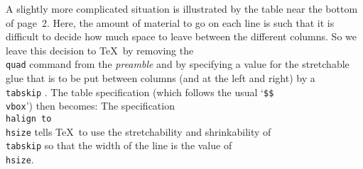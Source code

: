 A slightly more complicated situation is illustrated by the table near the
bottom of page~2. Here, the amount of material to go on each line is such
that it is difficult to decide how much space to leave between the
different columns.  So we leave this decision to \TeX\ by removing the
{\tt \\quad} command from the {\sl preamble} and by specifying a value for the
stretchable glue that is to be put between columns (and at the left and
right) by a {\tt \\tabskip} \cs.  The table
specification (which follows the usual `{\tt \$\$\\vbox\lbr}') then becomes:
\smallskip
The specification {\tt \\halign to \\hsize} tells \TeX\ to use the 
stretchability and shrinkability of {\tt \\tabskip} so that the width of
the line is the value of {\tt \\hsize}.

